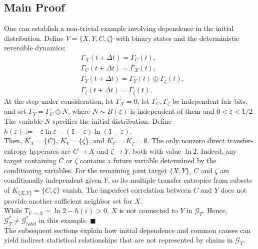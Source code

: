 \documentclass{comnet}%
\begin{document}
\subsection{\label{appsub:Main_Proof} Main Proof}
One can establish a non-trivial example involving dependence in the initial distribution. Define $V=\{X,Y,C,\zeta\}$ with binary states and the deterministic reversible dynamics:
\begin{equation}\begin{aligned}
 &\Gamma_X(t+\Delta t)=\Gamma_C(t),\\
 &\Gamma_C(t+\Delta t)=\Gamma_X(t),\\
 &\Gamma_Y(t+\Delta t)=\Gamma_Y(t)\oplus\Gamma_\zeta(t),\\
 &\Gamma_\zeta(t+\Delta t)=\Gamma_\zeta(t).
\end{aligned}\end{equation}
At the step under consideration, let $\Gamma_X=0$, let $\Gamma_C,\Gamma_\zeta$ be independent fair bits, and set $\Gamma_Y=\Gamma_C\oplus N$, where $N\sim B(\varepsilon)$ is independent of them and $0<\varepsilon<1/2$. The variable $N$ specifies the initial distribution. Define $h(\varepsilon):=-\varepsilon\ln\varepsilon-(1-\varepsilon)\ln(1-\varepsilon)$.\\
Then, $K_X=\{C\}$, $K_Y=\{\zeta\}$, and $K_C=K_\zeta=\emptyset$. The only nonzero direct transfer-entropy hyperarcs are $C\to X$ and $\zeta\to Y$, both with value $\ln 2$. Indeed, any target containing $C$ or $\zeta$ contains a future variable determined by the conditioning variables. For the remaining joint target $\{X,Y\}$, $C$ and $\zeta$ are conditionally independent given $Y$, so its multiple transfer entropies from subsets of $K_{\{X,Y\}}=\{C,\zeta\}$ vanish. The imperfect correlation between $C$ and $Y$ does not provide another sufficient neighbor set for $X$.\\
While $T_{Y\to X}=\ln 2-h(\varepsilon)>0$, $X$ is not connected to $Y$ in $\mathcal G_T$. Hence, $\mathcal G_T^*\ne\mathcal G_{total}^*$ in this example. $\blacksquare$\\

The subsequent sections explain how initial dependence and common causes can yield indirect statistical relationships that are not represented by chains in $\mathcal G_T$.\\
\end{document}
